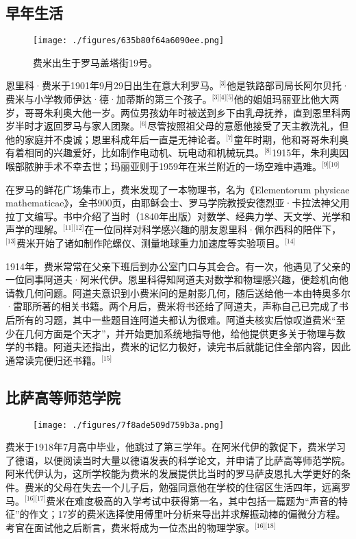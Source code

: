 \subsection{早年生活}
\begin{figure}[ht]
\centering
\texttt{[image: ./figures/635b80f64a6090ee.png]}
\caption{费米出生于罗马盖塔街19号。} \label{fig_ELK_1}
\end{figure}
恩里科·费米于1901年9月29日出生在意大利罗马。\(^\text{[3]}\)他是铁路部司局长阿尔贝托·费米与小学教师伊达·德·加蒂斯的第三个孩子。\(^\text{[3][4][5]}\)他的姐姐玛丽亚比他大两岁，哥哥朱利奥大他一岁。两位男孩幼年时被送到乡下由乳母抚养，直到恩里科两岁半时才返回罗马与家人团聚。\(^\text{[6]}\)尽管按照祖父母的意愿他接受了天主教洗礼，但他的家庭并不虔诚；恩里科成年后一直是无神论者。\(^\text{[7]}\)童年时期，他和哥哥朱利奥有着相同的兴趣爱好，比如制作电动机、玩电动和机械玩具。\(^\text{[8]}\)1915年，朱利奥因喉部脓肿手术不幸去世；玛丽亚则于1959年在米兰附近的一场空难中遇难。\(^\text{[9][10]}\)

在罗马的鲜花广场集市上，费米发现了一本物理书，名为《Elementorum physicae mathematicae》，全书900页，由耶稣会士、罗马学院教授安德烈亚·卡拉法神父用拉丁文编写。书中介绍了当时（1840年出版）对数学、经典力学、天文学、光学和声学的理解。\(^\text{[11][12]}\)在一位同样对科学感兴趣的朋友恩里科·佩尔西科的陪伴下，\(^\text{[13]}\)费米开始了诸如制作陀螺仪、测量地球重力加速度等实验项目。\(^\text{[14]}\)

1914年，费米常常在父亲下班后到办公室门口与其会合。有一次，他遇见了父亲的一位同事阿道夫·阿米代伊。恩里科得知阿道夫对数学和物理感兴趣，便趁机向他请教几何问题。阿道夫意识到小费米问的是射影几何，随后送给他一本由特奥多尔·雷耶所著的相关书籍。两个月后，费米将书还给了阿道夫，声称自己已完成了书后所有的习题，其中一些题目连阿道夫都认为很难。阿道夫核实后惊叹道费米“至少在几何方面是个天才”，并开始更加系统地指导他，给他提供更多关于物理与数学的书籍。阿道夫还指出，费米的记忆力极好，读完书后就能记住全部内容，因此通常读完便归还书籍。\(^\text{[15]}\)
\subsection{比萨高等师范学院}
\begin{figure}[ht]
\centering
\texttt{[image: ./figures/7f8ade509d759b3a.png]}
\caption{} \label{fig_ELK_2}
\end{figure}
费米于1918年7月高中毕业，他跳过了第三学年。在阿米代伊的敦促下，费米学习了德语，以便阅读当时大量以德语发表的科学论文，并申请了比萨高等师范学院。阿米代伊认为，这所学校能为费米的发展提供比当时的罗马萨皮恩扎大学更好的条件。费米的父母在失去一个儿子后，勉强同意他在学校的住宿区生活四年，远离罗马。\(^\text{[16][17]}\)费米在难度极高的入学考试中获得第一名，其中包括一篇题为“声音的特征”的作文；17岁的费米选择使用傅里叶分析来导出并求解振动棒的偏微分方程。考官在面试他之后断言，费米将成为一位杰出的物理学家。\(^\text{[16][18]}\)

